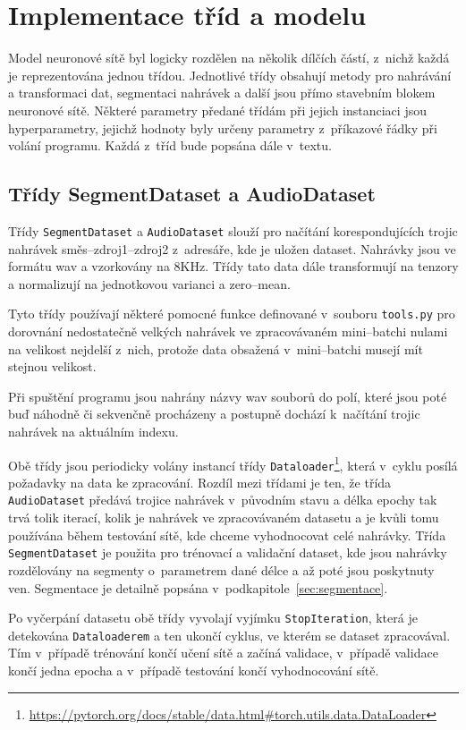 \section{Implementace tříd a modelu}
Model neuronové sítě byl logicky rozdělen na několik dílčích částí, z~nichž každá je reprezentována jednou třídou. Jednotlivé třídy obsahují metody pro nahrávání a transformaci dat, segmentaci nahrávek a další jsou přímo stavebním blokem neuronové sítě. Některé parametry předané třídám při jejich instanciaci jsou hyperparametry, jejichž hodnoty byly určeny parametry z~příkazové řádky při volání programu. Každá z~tříd bude popsána dále v~textu.


\subsection*{Třídy SegmentDataset a AudioDataset}
Třídy \texttt{SegmentDataset} a \texttt{AudioDataset} slouží pro načítání korespondujících trojic nahrávek směs--zdroj1--zdroj2 z~adresáře, kde je uložen dataset. Nahrávky jsou ve formátu wav a vzorkovány na 8KHz. Třídy tato data dále transformují na tenzory a normalizují na jednotkovou varianci a zero--mean. 

Tyto třídy používají některé pomocné funkce definované v~souboru \texttt{tools.py} pro dorovnání nedostatečně velkých nahrávek ve zpracovávaném mini--batchi nulami na velikost nejdelší z~nich, protože data obsažená v~mini--batchi musejí mít stejnou velikost.

Při spuštění programu jsou nahrány názvy wav souborů do polí, které jsou poté buď náhodně či sekvenčně procházeny a postupně dochází k~načítání trojic nahrávek na aktuálním indexu. 

Obě třídy jsou periodicky volány instancí třídy \texttt{Dataloader}\footnote{\url{https://pytorch.org/docs/stable/data.html\#torch.utils.data.DataLoader}}, která v~cyklu posílá požadavky na data ke zpracování. Rozdíl mezi třídami je ten, že třída \texttt{AudioDataset} předává trojice nahrávek v~původním stavu a délka epochy tak trvá tolik iterací, kolik je nahrávek ve zpracovávaném datasetu a je kvůli tomu používána během testování sítě, kde chceme vyhodnocovat celé nahrávky. Třída \texttt{SegmentDataset} je použita pro trénovací a validační dataset, kde jsou nahrávky rozdělovány na segmenty o~parametrem dané délce a až poté jsou poskytnuty ven. Segmentace je detailně popsána v~podkapitole~\ref{sec:segmentace}.

Po vyčerpání datasetu obě třídy vyvolají vyjímku \texttt{StopIteration}, která je detekována \texttt{Dataloaderem} a ten ukončí cyklus, ve kterém se dataset zpracovával. Tím v~případě trénování končí učení sítě a začíná validace, v~případě validace končí jedna epocha a v~případě testování končí vyhodnocování sítě.


